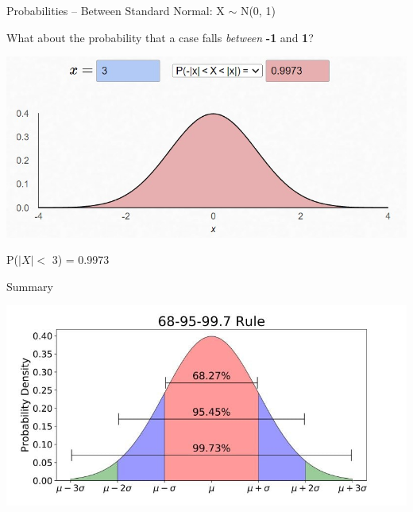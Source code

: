 \documentclass{beamer}
\begin{document}
\begin{frame}{Probabilities -- Between}
Standard Normal: X $\sim$ N(0, 1)

What about the probability that a case falls \textit{between} \textbf{-1} and \textbf{1}?
\begin{center}
    \includegraphics[scale=.7]{img/norm_prob8.jpg}

    P($|X| <$ 3) = 0.9973
\end{center}
\end{frame}

\begin{frame}{Summary}
\begin{center}
    \includegraphics[scale=.45]{img/empirical_rule.jpg}
\end{center}
\end{frame}
\end{document}
